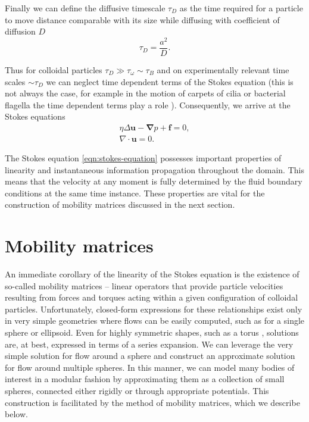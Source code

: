 \documentclass{doctoral}
\begin{document}
Finally we can define the diffusive timescale $\tau_D$ as the time required for a particle to move distance comparable with its size while diffusing with coefficient of diffusion $D$
\begin{equation}
    \tau_D = \frac{a^2}{D}.
    \label{eqn:diffusive-timescale}
\end{equation}

Thus for colloidal particles $\tau_D \gg \tau_\omega \sim \tau_B$ and on experimentally relevant time scales $\sim \tau_D$ we can neglect time dependent terms of the Stokes equation (this is not always the case, for example in the motion of carpets of cilia or bacterial flagella the time dependent terms play a role \cite{Wei_2021}).
Consequently, we arrive at the Stokes equations
\begin{eqnarray}
    \eta \Delta \bm{u} - \bm{\nabla} p + \bm{f} = 0, \label{eqn:stokes-equation} \\
    \nabla \cdot \bm{u} = 0.
\end{eqnarray}

The Stokes equation \eqref{eqn:stokes-equation} possesses important properties of linearity and instantaneous information propagation throughout the domain.
This means that the velocity at any moment is fully determined by the fluid boundary conditions at the same time instance.
These properties are vital for the construction of mobility matrices discussed in the next section.

\section{Mobility matrices}

An immediate corollary of the linearity of the Stokes equation is the existence of so-called mobility matrices -- linear operators that provide particle velocities resulting from forces and torques acting within a given configuration of colloidal particles.
Unfortunately, closed-form expressions for these relationships exist only in very simple geometries where flows can be easily computed, such as for a single sphere or ellipsoid.
Even for highly symmetric shapes, such as a torus \cite{Goren_1980, Majumdar_1977}, solutions are, at best, expressed in terms of a series expansion.
We can leverage the very simple solution for flow around a sphere and construct an approximate solution for flow around multiple spheres.
In this manner, we can model many bodies of interest in a modular fashion by approximating them as a collection of small spheres, connected either rigidly or through appropriate potentials.
This construction is facilitated by the method of mobility matrices, which we describe below.
\end{document}
